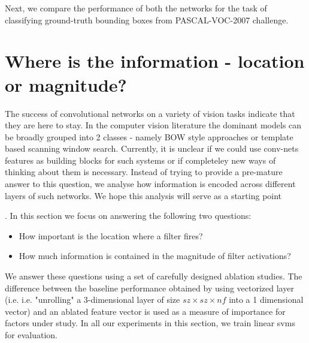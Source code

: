 \documentclass[runningheads]{llncs}
\begin{document}
Next, we compare the performance of both the networks for the task of classifying ground-truth bounding boxes from PASCAL-VOC-2007 challenge.  

\section{Where is the information - location or magnitude?}
The success of convolutional networks on a variety of vision tasks indicate that they are here to stay. In the computer vision literature the dominant models can be broadly grouped into 2 classes - namely BOW style approaches or template based scanning window search. Currently, it is unclear if we could use conv-nets features as building blocks for such systems or if completeley new ways of thinking about them is necessary. 
Instead of trying to provide a pre-mature answer to this question, we analyse how information is encoded across different layers of such  networks. We hope this analysis will serve as a starting point

. In this section we focus on answering the following two questions:
\begin{itemize}
\item How important is the location where a filter fires?
\item How much information is contained in the magnitude of filter activations?
\end{itemize}

We answer these questions using a set of carefully designed ablation studies. The difference between the baseline performance obtained by using vectorized  layer (i.e. i.e. "unrolling" a 3-dimensional layer of size $sz \times sz \times nf$ into a 1 dimensional vector) and an ablated feature vector is used as a measure of importance for factors under study. In all our experiments in this section, we train linear svms for evaluation.
\end{document}

